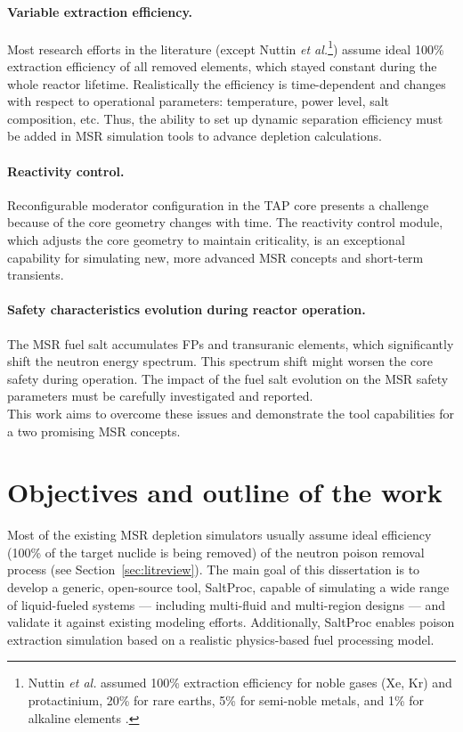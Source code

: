 \paragraph*{Variable extraction efficiency.} Most research efforts in 
the literature (except Nuttin \emph{et al.}\footnote{Nuttin \emph{et al.} 
assumed 100\% extraction efficiency for noble gases (Xe, Kr) and protactinium, 
20\% for rare earths, 5\% for semi-noble metals, and 1\% for alkaline 
elements \cite{nuttin_potential_2005}.}) assume ideal 100\% extraction 
efficiency of all removed 
elements, which stayed constant during the whole reactor lifetime. 
Realistically the efficiency is time-dependent and changes with respect to 
operational parameters: temperature, power level, salt composition, etc. Thus, 
the ability to set up dynamic separation efficiency must be added in \gls{MSR} 
simulation tools to advance depletion calculations.
\paragraph*{Reactivity control.} Reconfigurable moderator configuration in the 
\gls{TAP} core presents a challenge because of the core geometry changes with 
time. The reactivity control module, which adjusts the core geometry 
to maintain criticality, is an exceptional capability for simulating  
new, more advanced \gls{MSR} concepts and short-term transients.
\paragraph*{Safety characteristics evolution during reactor operation.} The 
\gls{MSR} fuel salt  accumulates \glspl{FP} and transuranic elements, which 
significantly shift the neutron energy spectrum. This spectrum shift might 
worsen the core safety during operation. The impact of the fuel salt 
evolution on the \gls{MSR} safety parameters must be carefully investigated 
and reported.\\

This work aims to overcome these issues and demonstrate the tool capabilities 
for a two promising \gls{MSR} concepts.


\section{Objectives and outline of the work}
Most of the existing \gls{MSR} depletion simulators usually assume ideal  
efficiency (100\% of the target nuclide is being removed) of the neutron 
poison removal process (see Section~\ref{sec:litreview}). The main goal of 
this dissertation is to develop a generic, open-source tool, SaltProc, capable 
of simulating a wide range of liquid-fueled systems --- including multi-fluid 
and multi-region designs --- and validate it against existing modeling 
efforts. Additionally, SaltProc enables poison extraction simulation based on 
a realistic physics-based fuel processing model. 

